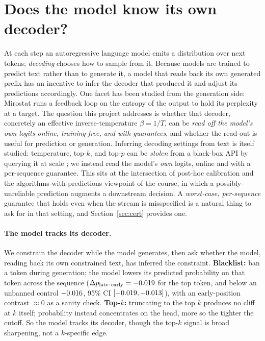 \documentclass[11pt]{article}
\begin{document}
\section{Does the model know its own decoder?}\label{sec:know}
At each step an autoregressive language model emits a distribution over next
tokens; \emph{decoding} chooses how to sample from it.
Because models are trained to predict text rather than to generate it, a model
that reads back its own generated prefix has an incentive to infer the decoder
that produced it and adjust its predictions accordingly. One facet has been studied from
the generation side: Mirostat \citep{basu2021mirostat} runs a feedback loop
on the entropy of the output to hold its perplexity at a target.
The question this project addresses is whether that decoder, concretely an
effective inverse-temperature $\beta = 1/T$, can be \emph{read off the model's
own logits online, training-free, and with guarantees}, and whether the read-out
is useful for prediction or generation.
Inferring decoding settings from text is itself studied: temperature, top-$k$,
and top-$p$ can be \emph{stolen} from a black-box API by querying it at scale
\citep{naseh2023stealing}; we instead read the model's \emph{own} logits, online
and with a per-sequence guarantee.
This sits at the intersection of post-hoc calibration
\citep{guo2017calibration,liu2024temperature} and the
algorithms-with-predictions viewpoint \citep{mitzenmacher2020algorithms} of the
course, in which a possibly-unreliable prediction augments a downstream decision.
A \emph{worst-case, per-sequence} guarantee that holds even when the stream is
misspecified is a natural thing to ask for in that setting, and
Section~\ref{sec:cert} provides one.

\paragraph{The model tracks its decoder.}
We constrain the decoder while the model generates, then ask whether the model,
reading back its own constrained text, has inferred the constraint.
\textbf{Blacklist:} ban a token during generation; the model lowers its predicted
probability on that token across the sequence
($\Delta p_{\text{late--early}} = -0.019$ for the top token, and below
an unbanned control $-0.016$, 95\% CI $[-0.019,-0.013]$),
with an early-position contrast $\approx 0$ as a sanity check.
\textbf{Top-$k$:} truncating to the top $k$ produces no cliff at $k$ itself;
probability instead concentrates on the head, more so the tighter the cutoff.
So the model tracks its decoder, though the top-$k$ signal is broad sharpening,
not a $k$-specific edge.
\end{document}
